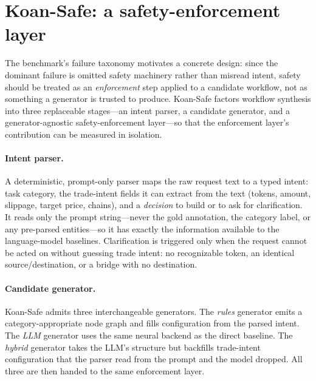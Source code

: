 \section{Koan-Safe: a safety-enforcement layer}
\label{sec:koansafe}

The benchmark's failure taxonomy motivates a concrete design: since the
dominant failure is omitted safety machinery rather than misread intent,
safety should be treated as an \emph{enforcement} step applied to a candidate
workflow, not as something a generator is trusted to produce. Koan-Safe
factors workflow synthesis into three replaceable stages---an intent parser,
a candidate generator, and a generator-agnostic safety-enforcement layer---so
that the enforcement layer's contribution can be measured in isolation.

\paragraph{Intent parser.} A deterministic, prompt-only parser maps the raw
request text to a typed intent: task category, the trade-intent fields it can
extract from the text (tokens, amount, slippage, target price, chains), and a
\emph{decision} to build or to ask for clarification. It reads only the prompt
string---never the gold annotation, the category label, or any pre-parsed
entities---so it has exactly the information available to the language-model
baselines. Clarification is triggered only when the request cannot be acted on
without guessing trade intent: no recognizable token, an identical
source/destination, or a bridge with no destination.

\paragraph{Candidate generator.} Koan-Safe admits three interchangeable
generators. The \emph{rules} generator emits a category-appropriate node
graph and fills configuration from the parsed intent. The \emph{LLM} generator
uses the same neural backend as the direct baseline. The \emph{hybrid}
generator takes the LLM's structure but backfills trade-intent configuration
that the parser read from the prompt and the model dropped. All three are then
handed to the same enforcement layer.

